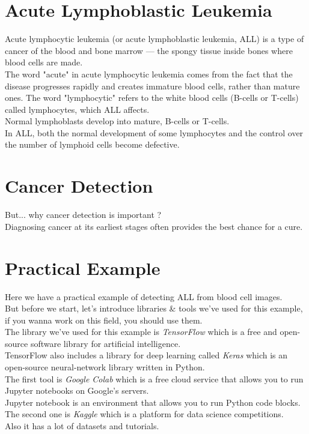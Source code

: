 \documentclass{SBCbookchapter}
\begin{document}
\section*{Acute Lymphoblastic Leukemia}
Acute lymphocytic leukemia (or acute lymphoblastic leukemia, ALL)
is a type of cancer of the blood and bone marrow — 
the spongy tissue inside bones where blood cells are made. \\
The word "acute" in acute lymphocytic leukemia comes
from the fact that the disease progresses rapidly and
creates immature blood cells, rather than mature ones.
The word "lymphocytic" 
refers to the white blood cells (B-cells or T-cells) called lymphocytes, 
which ALL affects. \\
Normal lymphoblasts develop into mature, B-cells or T-cells.\\
In ALL, both the normal development of some 
lymphocytes and the control over the number of 
lymphoid cells become defective.

\section*{Cancer Detection}
But... why cancer detection is important ? \\
Diagnosing cancer at its earliest stages often provides the
best chance for a cure.

\section*{Practical Example}
Here we have a practical example of detecting ALL from blood cell images. \\
But before we start, let's introduce libraries \& tools we've used for this example, if you wanna
work on this field, you should use them. \\
The library we've used for this example is \textit{TensorFlow} which is a free and open-source software library for artificial intelligence. \\
TensorFlow also includes a library for deep learning called \textit{Keras} which is an open-source neural-network library written in Python. \\
The first tool is \textit{Google Colab} which is a free cloud service
that allows you to run Jupyter notebooks on Google's servers. \\
Jupyter notebook is an environment that allows you to run Python code blocks. \\
The second one is \textit{Kaggle} which is a platform for data science competitions. \\
Also it has a lot of datasets and tutorials. \\
\end{document}
